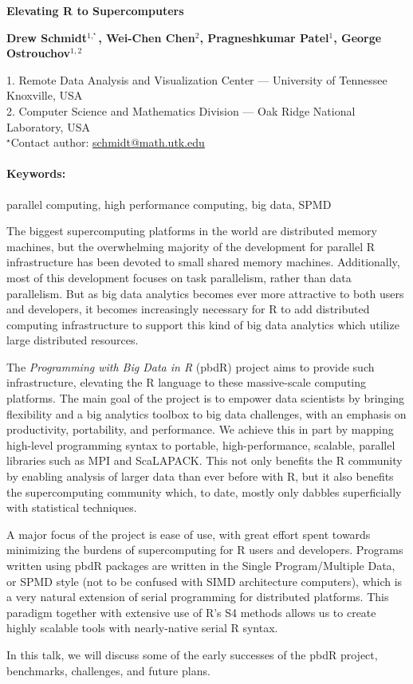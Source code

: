 \documentclass[11pt, a4paper]{article}
\let\proglang=\textsf
\renewcommand{\title}[1]{\begin{center}{\bf \LARGE #1}\end{center}}
\newcommand{\keywords}{\paragraph{Keywords:}}
\begin{document}
\pagestyle{empty}

\title{Elevating \proglang{R} to Supercomputers}

\begin{center}
  {\bf Drew Schmidt$^{1,^\star}$, Wei-Chen Chen$^{2}$, Pragneshkumar Patel$^{1}$, George Ostrouchov$^{1,2}$}
\end{center}

\begin{affiliations}
1. Remote Data Analysis and Visualization Center --- University of Tennessee Knoxville, USA \\[-2pt]
2. Computer Science and Mathematics Division --- Oak Ridge National Laboratory, USA \\[-2pt]
$^\star$Contact author: \href{mailto:schmidt@math.utk.edu}{schmidt@math.utk.edu}
\end{affiliations}


\keywords parallel computing, high performance computing, big data, SPMD

\vskip 0.8cm

The biggest supercomputing platforms in the world are distributed memory machines, but the overwhelming majority of the development for parallel \proglang{R} infrastructure has been devoted to small shared memory machines.  Additionally, most of this development focuses on task parallelism, rather than data parallelism.  But as big data analytics becomes ever more attractive to both users and developers, it becomes increasingly necessary for \proglang{R} to add distributed computing infrastructure to support this kind of big data analytics which utilize large distributed resources.  

The \emph{Programming with Big Data in \proglang{R}} (\proglang{pbdR}) project aims to provide such infrastructure, elevating the \proglang{R} language to these massive-scale computing platforms.  The main goal of the project is to empower data scientists by bringing flexibility and a big analytics toolbox to big data challenges, with an emphasis on productivity, portability, and performance.  We achieve this in part by mapping high-level programming syntax to portable, high-performance, scalable, parallel libraries such as MPI and ScaLAPACK.  This not only benefits the \proglang{R} community by enabling analysis of larger data than ever before with \proglang{R}, but it also benefits the supercomputing community which, to date, mostly only dabbles superficially with statistical techniques.

A major focus of the project is ease of use, with great effort spent towards minimizing the burdens of supercomputing for \proglang{R} users and developers.  Programs written using \proglang{pbdR} packages are written in the Single Program/Multiple Data, or SPMD style (not to be confused with SIMD architecture computers), which is a very natural extension of serial programming for distributed platforms.  This paradigm together with extensive use of \proglang{R}'s S4 methods allows us to create highly scalable tools with nearly-native serial \proglang{R} syntax.

In this talk, we will discuss some of the early successes of the \proglang{pbdR} project, benchmarks, challenges, and future plans.


\nocite{pbdR2012,slug,Chen2012pbdMPIpackage,Schmidt2012pbdDMATpackage,MPI1994}


\end{document}
